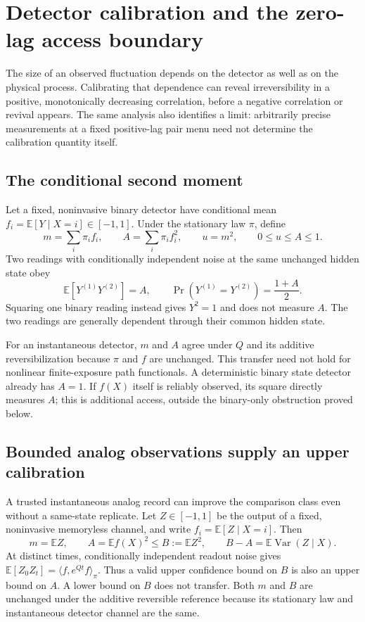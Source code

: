 \chapter{Detector calibration and the zero-lag access boundary}
\label{ch:ci-calibration}

The size of an observed fluctuation depends on the detector as well as on the
physical process. Calibrating that dependence can reveal irreversibility in a
positive, monotonically decreasing correlation, before a negative correlation
or revival appears. The same analysis also identifies a limit: arbitrarily
precise measurements at a fixed positive-lag pair menu need not determine the
calibration quantity itself.

\section{The conditional second moment}
Let a fixed, noninvasive binary detector have conditional mean
$f_i=\mathbb E[Y\mid X=i]\in[-1,1]$. Under the stationary law $\pi$, define
\begin{equation}
 m=\sum_i\pi_i f_i,\qquad A=\sum_i\pi_i f_i^2,
 \qquad u=m^2,\qquad0\leq u\leq A\leq1.
 \label{eq:ci-mA}
\end{equation}
Two readings with conditionally independent noise at the same unchanged hidden
state obey
\begin{equation}
 \mathbb E[Y^{(1)}Y^{(2)}]=A,
 \qquad\Pr(Y^{(1)}=Y^{(2)})=\frac{1+A}{2}.
 \label{eq:ci-zero-lag}
\end{equation}
Squaring one binary reading instead gives $Y^2=1$ and does not measure $A$.
The two readings are generally dependent through their common hidden state.

For an instantaneous detector, $m$ and $A$ agree under $Q$ and its additive
reversibilization because $\pi$ and $f$ are unchanged. This transfer need not
hold for nonlinear finite-exposure path functionals. A deterministic binary
state detector already has $A=1$. If $f(X)$ itself is reliably observed, its
square directly measures $A$; this is additional access, outside the binary-only
obstruction proved below.

\section{Bounded analog observations supply an upper calibration}
A trusted instantaneous analog record can improve the comparison class even
without a same-state replicate. Let $Z\in[-1,1]$ be the output of a fixed,
noninvasive memoryless channel, and write $f_i=\mathbb E[Z\mid X=i]$. Then
\begin{equation}
 m=\mathbb E Z,\qquad
 A=\mathbb E f(X)^2\leq B:=\mathbb E Z^2,
 \qquad B-A=\mathbb E\operatorname{Var}(Z\mid X).
 \label{eq:ci-analog-upper}
\end{equation}
At distinct times, conditionally independent readout noise gives
$\mathbb E[Z_0Z_t]=\langle f,e^{Qt}f\rangle_\pi$. Thus a valid upper confidence
bound on $B$ is also an upper bound on $A$. A lower bound on $B$ does not transfer.
Both $m$ and $B$ are unchanged under the additive reversible reference because
its stationary law and instantaneous detector channel are the same.

